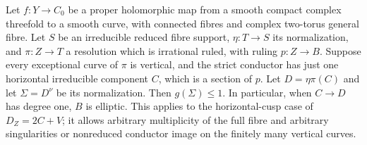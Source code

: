 
\begin{proposition}\label{cdp:st:A.5.11}
Let $f:Y\to C_0$ be a proper holomorphic map from a smooth
compact complex threefold to a smooth curve, with connected
fibres and complex two-torus general fibre. Let $S$ be an
irreducible reduced fibre support, $\eta:T\to S$ its
normalization, and $\pi:Z\to T$ a resolution which is
irrational ruled, with ruling $p:Z\to B$.
Suppose every exceptional curve of $\pi$ is vertical, and
the strict conductor has just one horizontal irreducible
component $C$, which is a section of $p$.
Let $D=\eta\pi(C)$ and let $\Sigma=D^\nu$ be its normalization.
Then $g(\Sigma)\le1$.
In particular, when $C\to D$ has degree one, $B$ is elliptic.
This applies to the horizontal-cusp case of $D_Z=2C+V$;
it allows arbitrary multiplicity of the full fibre and
arbitrary singularities or nonreduced conductor image on
the finitely many vertical curves.
\end{proposition}
